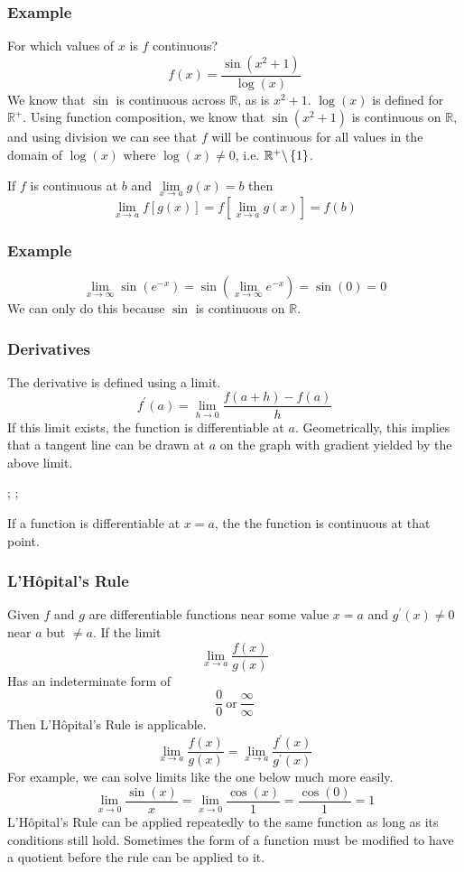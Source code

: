 \documentclass[12pt]{report}
\newcommand{\R}{\mathbb{R}}
\newcommand{\limit}{\lim\limits}
\begin{document}
\begin{flushleft}
\subsubsection*{Example}
For which values of \(x\) is \(f\) continuous?
\[f(x) = \frac{\sin(x^2 + 1)}{\log(x)}\]
We know that \(\sin\) is continuous across \(\R\), as is \(x^2 + 1\). 
\(\log(x)\) is defined for \(\R^+\). Using function composition, we
know that \(\sin(x^2 + 1)\) is continuous on \(\R\), and using division we can
see that \(f\) will be continuous for all values in the domain of \(\log(x)\) 
where \(\log(x) \neq 0\), i.e. \(\R^+ \backslash \set{1}\).

\bigskip
If \(f\) is continuous at \(b\) and \(\limit_{x\rightarrow a} g(x) = b\) then
\[\limit_{x\rightarrow a} f\left[g(x)\right] 
= f\left[\limit_{x\rightarrow a}g(x)\right] = f(b)\]

\subsubsection*{Example}
\[\limit_{x\rightarrow\infty} \sin\left(e^{-x}\right)
= \sin\left(\limit_{x\rightarrow\infty} e^{-x}\right) = \sin(0) = 0\]
We can only do this because \(\sin\) is continuous on \(\R\).

\subsubsection*{Derivatives}
The derivative is defined using a limit.
\[f^\prime(a) = \limit_{h\rightarrow0}\frac{f(a + h) - f(a)}{h}\]
If this limit exists, the function is differentiable at \(a\). Geometrically,
this implies that a tangent line can be drawn at \(a\) on the graph with 
gradient yielded by the above limit.

\begin{plot}
    ;
    ;
\end{plot}

If a function is differentiable at \(x = a\), the the function is continuous
at that point.

\subsubsection*{L'H\^{o}pital's Rule}
Given \(f\) and \(g\) are differentiable functions near some value \(x = a\)
and \(g^\prime(x) \neq 0\) near \(a\) but \(\neq a\). If the limit
\[\limit_{x\rightarrow a} \frac{f(x)}{g(x)}\]
Has an indeterminate form of
\[\frac{0}{0} \:\mathrm{or}\: \frac{\infty}{\infty}\]
Then L'H\^{o}pital's Rule is applicable.
\[\limit_{x\rightarrow a}\frac{f(x)}{g(x)} 
= \limit_{x\rightarrow a}\frac{f^\prime(x)}{g^\prime(x)}\]
For example, we can solve limits like the one below much more easily.
\[\limit_{x\rightarrow0}\frac{\sin(x)}{x} 
= \limit_{x\rightarrow0}\frac{\cos(x)}{1} = \frac{\cos(0)}{1} = 1\]
L'H\^{o}pital's Rule can be applied repeatedly to the same function as long
as its conditions still hold. Sometimes the form of a function must be modified
to have a quotient before the rule can be applied to it.


\end{flushleft}
\end{document}

